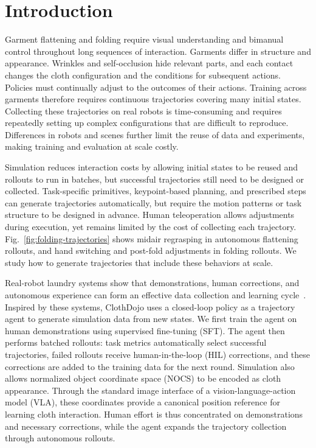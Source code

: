 \section{Introduction}
\label{sec:introduction}

Garment flattening and folding require visual understanding and bimanual
control throughout long sequences of interaction. Garments differ in structure
and appearance. Wrinkles and self-occlusion hide relevant parts, and each
contact changes the cloth configuration and the conditions for subsequent
actions. Policies must continually adjust to the outcomes of their actions.
Training across garments therefore requires continuous trajectories covering
many initial states. Collecting these trajectories on real robots is
time-consuming and requires repeatedly setting up complex configurations that
are difficult to reproduce. Differences in robots and scenes further limit
the reuse of data and experiments, making training and evaluation at scale
costly.

Simulation reduces interaction costs by allowing initial states to be reused
and rollouts to run in batches, but successful trajectories still need to be
designed or collected. Task-specific primitives, keypoint-based planning, and
prescribed steps can generate trajectories automatically, but require the
motion patterns or task structure to be designed in advance. Human
teleoperation allows adjustments during execution, yet remains limited by the
cost of collecting each trajectory. Fig.~\ref{fig:folding-trajectories} shows
midair regrasping in autonomous flattening rollouts, and hand switching and
post-fold adjustments in folding rollouts. We study how to generate
trajectories that include these behaviors at scale.

Real-robot laundry systems show that demonstrations, human corrections, and
autonomous experience can form an effective data collection and learning
cycle~\cite{pistar06,chi0,demavla}. Inspired by these systems, ClothDojo uses a
closed-loop policy as a trajectory agent to generate simulation data from new
states. We first train the agent on human demonstrations using supervised
fine-tuning (SFT). The agent then performs batched rollouts: task metrics automatically
select successful trajectories, failed rollouts receive human-in-the-loop
(HIL) corrections, and these corrections are added to the training data for
the next round. Simulation also allows normalized object coordinate space
(NOCS) to be encoded as cloth
appearance. Through the standard image interface of a vision-language-action
model (VLA), these coordinates provide a canonical position reference for
learning cloth interaction. Human effort is thus concentrated on
demonstrations and necessary corrections, while the agent expands the
trajectory collection through autonomous rollouts.

